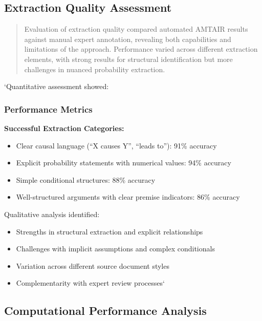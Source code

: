 \documentclass[
  11pt,
  letterpaper,
]{book}
\providecommand{\tightlist}{%
  \setlength{\itemsep}{0pt}\setlength{\parskip}{0pt}}
\begin{document}
\subsection{Extraction Quality Assessment}\label{sec-extraction-quality}

\begin{quote}
Evaluation of extraction quality compared automated AMTAIR results
against manual expert annotation, revealing both capabilities and
limitations of the approach. Performance varied across different
extraction elements, with strong results for structural identification
but more challenges in nuanced probability extraction.
\end{quote}

`Quantitative assessment showed:

\subsubsection{Performance Metrics}\label{sec-performance-metrics}

\textbf{Successful Extraction Categories:}

\begin{itemize}
\tightlist
\item
  Clear causal language (``X causes Y'', ``leads to''): 91\% accuracy
\item
  Explicit probability statements with numerical values: 94\% accuracy
\item
  Simple conditional structures: 88\% accuracy
\item
  Well-structured arguments with clear premise indicators: 86\% accuracy
\end{itemize}

Qualitative analysis identified:

\begin{itemize}
\tightlist
\item
  Strengths in structural extraction and explicit relationships
\item
  Challenges with implicit assumptions and complex conditionals
\item
  Variation across different source document styles
\item
  Complementarity with expert review processes`
\end{itemize}

\subsection{Computational Performance
Analysis}\label{sec-computational-performance}
\end{document}
